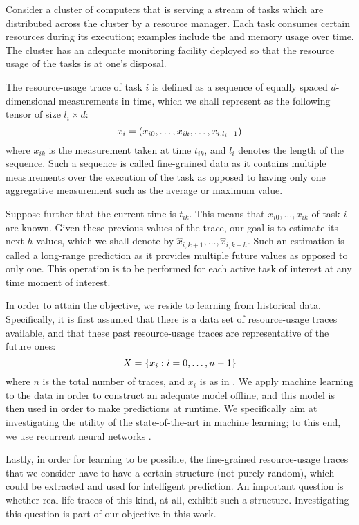 Consider a cluster of computers that is serving a stream of tasks which are
distributed across the cluster by a resource manager. Each task consumes certain
resources during its execution; examples include the  and memory usage
over time. The cluster has an adequate monitoring facility deployed so that the
resource usage of the tasks is at one's disposal.

The resource-usage trace of task $i$ is defined as a sequence of equally spaced
$d$-dimensional measurements in time, which we shall represent as the following
tensor of size $l_i \times d$:
\begin{equation} \elab{trace}
  x_i = \left(x_{i0}, \dots, x_{ik}, \dots, x_{i,l_i - 1}\right)
\end{equation}
where $x_{ik}$ is the measurement taken at time $t_{ik}$, and $l_i$ denotes the
length of the sequence. Such a sequence is called fine-grained data as it
contains multiple measurements over the execution of the task as opposed to
having only one aggregative measurement such as the average or maximum value.

Suppose further that the current time is $t_{ik}$. This means that $x_{i0},
\dots, x_{ik}$ of task $i$ are known. Given these previous values of the trace,
our goal is to estimate its next $h$ values, which we shall denote by
$\hat{x}_{i,k + 1}, \dots, \hat{x}_{i,k + h}$. Such an estimation is called a
long-range prediction as it provides multiple future values as opposed to only
one. This operation is to be performed for each active task of interest at any
time moment of interest.

In order to attain the objective, we reside to learning from historical data.
Specifically, it is first assumed that there is a data set of resource-usage
traces available, and that these past resource-usage traces are representative
of the future ones:
\begin{equation} \elab{traces}
  X = \{ x_i: i = 0, \dots, n - 1 \}
\end{equation}
where $n$ is the total number of traces, and $x_i$ is as in . We
apply machine learning to the data in order to construct an adequate model
offline, and this model is then used in order to make predictions at runtime. We
specifically aim at investigating the utility of the state-of-the-art in machine
learning; to this end, we use recurrent neural networks \cite{goodfellow2016}.

Lastly, in order for learning to be possible, the fine-grained resource-usage
traces that we consider have to have a certain structure (not purely random),
which could be extracted and used for intelligent prediction. An important
question is whether real-life traces of this kind, at all, exhibit such a
structure. Investigating this question is part of our objective in this work.

